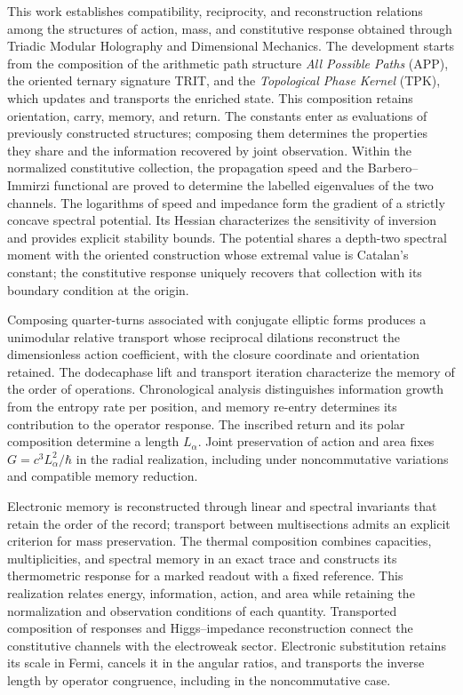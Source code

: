\begingroup\fontsize{9.5}{10.7}\selectfont\setlength{\parskip}{1.5pt}\renewenvironment{abstract}{\begin{center}\bfseries\abstractname\end{center}\noindent}{\par}\begin{abstract}
This work establishes compatibility, reciprocity, and reconstruction
relations among the structures of action, mass, and constitutive response
obtained through Triadic Modular Holography and Dimensional Mechanics.
The development starts from the composition of the arithmetic path
structure \emph{All Possible Paths} (APP), the oriented ternary signature
TRIT, and the \emph{Topological Phase Kernel} (TPK), which updates and
transports the enriched state. This composition retains orientation,
carry, memory, and return. The constants enter as evaluations
of previously constructed structures; composing them determines the
properties they share and the information recovered by joint observation.
Within the normalized constitutive collection, the propagation speed and the
Barbero--Immirzi functional are proved to determine the labelled
eigenvalues of the two channels. The logarithms of speed and impedance
form the gradient of a strictly concave spectral potential. Its Hessian
characterizes the sensitivity of inversion and provides explicit stability
bounds. The potential shares a depth-two spectral moment with the oriented
construction whose extremal value is Catalan's constant; the constitutive
response uniquely recovers that collection with its boundary condition at
the origin.

Composing quarter-turns associated with conjugate elliptic forms produces
a unimodular relative transport whose reciprocal dilations reconstruct the
dimensionless action coefficient, with the closure coordinate and
orientation retained. The dodecaphase lift and transport iteration
characterize the memory of the order of operations. Chronological analysis
distinguishes information growth from the entropy rate per position, and
memory re-entry determines its contribution to the operator response.
The inscribed return and its polar composition determine a length
$L_\alpha$. Joint preservation of action and area fixes
$G=c^3L_\alpha^2/\hbar$ in the radial realization, including under
noncommutative variations and compatible memory reduction.

Electronic memory is reconstructed through linear and spectral invariants
that retain the order of the record; transport between multisections
admits an explicit criterion for mass preservation. The thermal
composition combines capacities, multiplicities, and spectral memory in
an exact trace and constructs its thermometric response for a marked
readout with a fixed reference. This realization relates energy,
information, action, and area while retaining the normalization and
observation conditions of each quantity.
Transported composition of responses and Higgs--impedance reconstruction
connect the constitutive channels with the electroweak sector. Electronic
substitution retains its scale in Fermi, cancels it in the angular ratios,
and transports the inverse length by operator congruence, including in
the noncommutative case.


\end{abstract}
